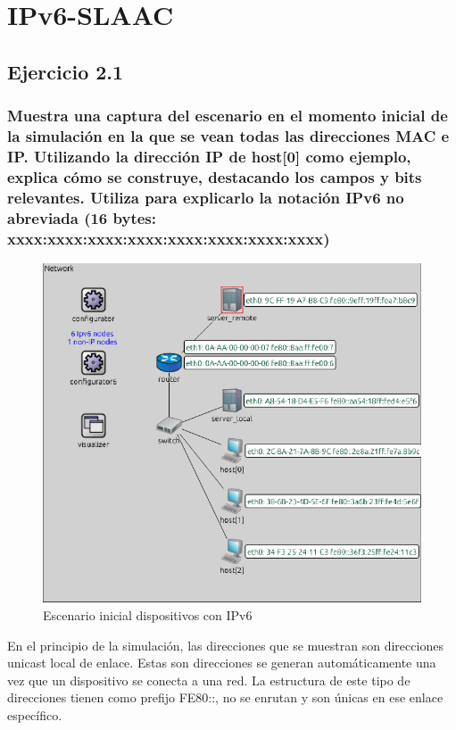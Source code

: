 \chapter{IPv6-SLAAC}
\label{chap:ipv6_slaac}

\section{Ejercicio 2.1}
\subsection{Muestra una captura del escenario en el momento inicial de la simulación en la que se vean todas las
direcciones MAC e IP. Utilizando la dirección IP de host[0] como ejemplo, explica cómo se construye, destacando
los campos y bits relevantes. Utiliza para explicarlo la notación IPv6 no abreviada (16 bytes:
xxxx:xxxx:xxxx:xxxx:xxxx:xxxx:xxxx:xxxx)}

\begin{figure}[!ht]
    \centering
    \includegraphics[width=135mm, scale=0.75]{imaxes/captura_ejer2_1.png}
    \caption{Escenario inicial dispositivos con IPv6}
    \label{fig:direccion_ipv6_host0}
\end{figure}

En el principio de la simulación, las direcciones que se muestran son direcciones unicast local de enlace. Estas son direcciones se generan automáticamente una vez que un dispositivo se conecta a una red. La estructura de este tipo de direcciones tienen como prefijo FE80::, no se enrutan y son únicas en ese enlace específico.

